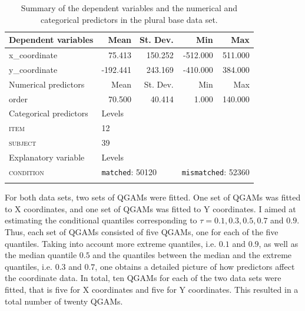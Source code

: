 \begin{table}\fontsize{10}{11}
\caption{Summary of the dependent variables and the numerical and categorical predictors in the plural base data set.}
\label{tab:7.10}
\centering
\begin{tabular}{lrrrr} 
\lsptoprule
Dependent variables    & Mean     & St. Dev.                  & Min      & Max                           \\ 
\midrule
x\_coordinate          & 75.413   & 150.252                   & -512.000 & 511.000                       \\
y\_coordinate          & -192.441 & 243.169                   & -410.000 & 384.000                       \\ 
\midrule
Numerical predictors   & Mean     & St. Dev.                  & Min      & Max                           \\ 
\midrule
order                  & 70.500   & 40.414                    & 1.000    & 140.000                       \\ 
\midrule
Categorical predictors & \multicolumn{1}{l}{Levels}   & ~                         & ~        & ~                             \\ 
\midrule
\textsc{item}                   & \multicolumn{1}{l}{12}       & ~                         & ~        & ~                             \\
\textsc{subject}                & \multicolumn{1}{l}{39}       & ~                         & ~        & ~                             \\ 
\midrule
Explanatory variable   & \multicolumn{1}{l}{Levels}   & ~                         & ~        & ~                             \\ 
\midrule
\textsc{condition}              & \multicolumn{2}{l}{\texttt{matched}:
  50120} & \multicolumn{2}{l}{\texttt{mismatched}:
  52360}  \\
\lspbottomrule
\end{tabular}
\end{table}

For both data sets, two sets of QGAMs were fitted. One set of QGAMs was fitted to X coordinates, and one set of QGAMs was fitted to Y coordinates. I aimed at estimating the conditional quantiles corresponding to $\tau=0.1,0.3,0.5,0.7$ and $0.9$. Thus, each set of QGAMs consisted of five QGAMs, one for each of the five quantiles. Taking into account more extreme quantiles, i.e. $0.1$ and $0.9$, as well as the median quantile $0.5$ and the quantiles between the median and the extreme quantiles, i.e. $0.3$ and $0.7$, one obtains a detailed picture of how predictors affect the coordinate data. In total, ten QGAMs for each of the two data sets were fitted, that is five for X coordinates and five for Y coordinates. This resulted in a total number of twenty QGAMs.

